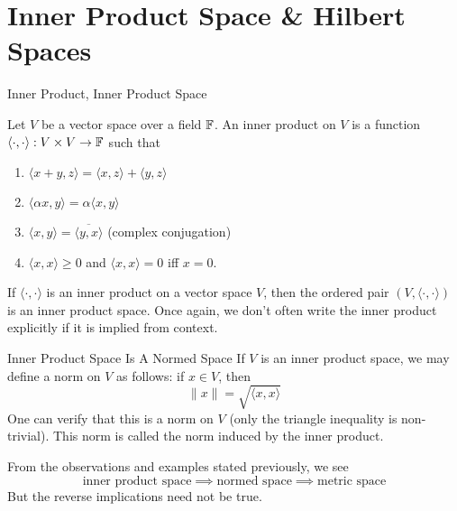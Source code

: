 \documentclass[10pt]{beamer}
\begin{document}
		\section{Inner Product Space \& Hilbert Spaces} 

		\begin{frame}{Inner Product, Inner Product Space}
				\begin{definition}
						Let $V$ be a vector space over a field $\mathbb{F}$. An \alert{inner product} on $V$ is a function $\langle \cdot, \cdot \rangle: V\times V\to \mathbb{F}$ such that 
						\begin{enumerate}
								\item $\langle x+y, z \rangle = \langle x, z\rangle + \langle y, z \rangle$ 
								\item $\langle \alpha x, y\rangle = \alpha \langle x, y \rangle$
								\item $\langle x, y \rangle = \overline{\langle y, x \rangle}$ (complex conjugation)
								\item $\langle x, x \rangle \geq 0$ and $\langle x, x \rangle = 0$ iff $x = 0$. 
						\end{enumerate}
						If $\langle \cdot, \cdot \rangle$ is an inner product on a vector space $V$, then the ordered pair $(V, \langle \cdot, \cdot \rangle)$ is an \alert{inner product space}. Once again, we don't often write the inner product explicitly if it is implied from context. 
				\end{definition}	
		\end{frame}

		\begin{frame}{Inner Product Space Is A Normed Space}
				If $V$ is an inner product space, we may define a norm on $V$ as follows: if $x\in V$, then 
				\begin{equation*}
						\|x\| = \sqrt{\langle x, x \rangle}
				\end{equation*}
				One can verify that this is a norm on $V$ (only the triangle inequality is non-trivial). This norm is called the \alert{norm induced by the inner product}.
				
				\begin{block}{}
						From the observations and examples stated previously, we see 
						\begin{equation*}
								\text{inner product space} \implies \text{normed space} \implies \text{metric space}
						\end{equation*}
						But the reverse implications need not be true.
				\end{block}
		\end{frame}
\end{document}
